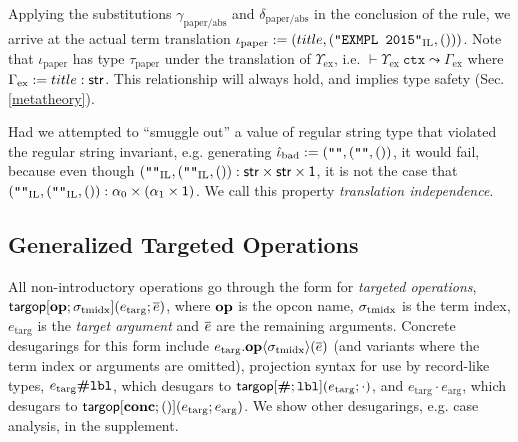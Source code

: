 \documentclass[pldi]{sigplanconf-pldi15}
\begin{document}
Applying the substitutions $\gamma_\text{paper/abs}$ and $\delta_\text{paper/abs}$ in the conclusion of the rule, we arrive at the actual term translation $\iota_\text{paper} := (title, (\texttt{"EXMPL 2015"}_\text{IL}, ()))$. Note that $\iota_\text{paper}$ has type $\tau_\text{paper}$ under the translation of $\Upsilon_\text{ex}$, i.e. $\vdash \Upsilon_\text{ex}~\mathtt{ctx} \leadsto \Gamma_\text{ex}$ where $\Gamma_\text{ex} := title : {\sf str}$. This relationship will always hold, and implies type safety (Sec. \ref{metatheory}). 

Had we attempted to ``smuggle out'' a value of regular string type that violated the regular string invariant, e.g. generating $\hat{\iota}_\text{bad} := (\texttt{""}, (\texttt{""}, ())$, it would fail, because even though $(\texttt{""}_\text{IL}, (\texttt{""}_\text{IL}, ()) : {\sf str} \times {\sf str} \times {\sf 1}$, it is not the case that $(\texttt{""}_\text{IL}, (\texttt{""}_\text{IL}, ()) : \alpha_0 \times (\alpha_1 \times {\sf 1})$. We call this property \emph{translation independence}.


\subsection{Generalized Targeted Operations} \label{sec:targops}
\noindent All non-introductory operations go through the form for \emph{targeted operations}, ${\sf targop}[\textbf{op}; \sigma_\text{tmidx}](e_\text{targ}; \overline{e})$, where $\textbf{op}$ is the opcon name, ${\sigma_\text{tmidx}}$ is the term index, $e_\text{targ}$ is the \emph{target argument} and $\overline{e}$ are the remaining arguments. Concrete desugarings for this form include $e_\text{targ}.\textbf{op}\langle\sigma_\text{tmidx}\rangle(\overline{e})$ (and variants where the term index or arguments are omitted), projection syntax for use by record-like types, $e_\text{targ}\textbf{\#}\texttt{lbl}$, which desugars to ${\sf targop}[\textbf{\#}; \texttt{lbl}](e_\text{targ}; \cdot)$, and $e_\text{targ} \cdot e_\text{arg}$, which desugars to ${\sf targop}[\textbf{conc}; ()](e_\text{targ}; e_\text{arg})$. We show other desugarings, e.g. case analysis, in the supplement.
\end{document}
